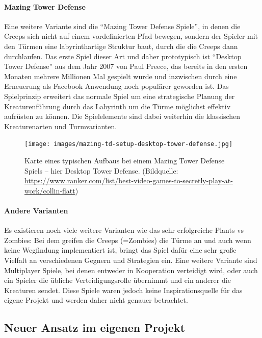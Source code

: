 \paragraph{Mazing Tower Defense}
Eine weitere Variante sind die \enquote{Mazing Tower Defense Spiele}, in denen die Creeps sich nicht auf einem vordefinierten Pfad bewegen, sondern der Spieler mit den Türmen eine labyrinthartige Struktur baut, durch die die Creeps dann durchlaufen. Das erste Spiel dieser Art und daher prototypisch ist \enquote{Desktop Tower Defense} aus dem Jahr 2007 von Paul Preece, das bereits in den ersten Monaten mehrere Millionen Mal gespielt wurde und inzwischen durch eine Erneuerung als Facebook Anwendung noch populärer geworden ist. Das Spielprinzip erweitert das normale Spiel um eine strategische Planung der Kreaturenführung durch das Labyrinth um die Türme möglichst effektiv aufrüsten zu können. Die Spielelemente sind dabei weiterhin die klassischen Kreaturenarten und Turmvarianten.
\begin{figure}[htb]
	\centering
	\texttt{[image: images/mazing-td-setup-desktop-tower-defense.jpg]}
	\caption{Karte eines typischen Aufbaus bei einem Mazing Tower Defense Spiels -- hier Desktop Tower Defense. {\footnotesize (Bildquelle: \url{https://www.ranker.com/list/best-video-games-to-secretly-play-at-work/collin-flatt})}}
\end{figure} 


\paragraph{Andere Varianten} Es existieren noch viele weitere Varianten wie das sehr erfolgreiche Plants vs Zombies: Bei dem greifen die Creeps (=Zombies) die Türme an und auch wenn keine Wegfindung implementiert ist, bringt das Spiel dafür eine sehr große Vielfalt an verschiedenen Gegnern und Strategien ein. Eine weitere Variante sind Multiplayer Spiele, bei denen entweder in Kooperation verteidigt wird, oder auch ein Spieler die übliche Verteidigungsrolle übernimmt und ein anderer die Kreaturen sendet. Diese Spiele waren jedoch keine Inspirationsquelle für das eigene Projekt und werden daher nicht genauer betrachtet.


\subsection{Neuer Ansatz im eigenen Projekt} %
\label{sub:neuer_ansatz_im_eigenen_projekt}

